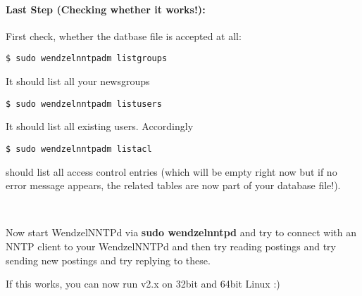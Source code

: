 \paragraph*{Last Step (Checking whether it works!):}

First check, whether the datbase file is accepted at all:

\begin{verbatim}
$ sudo wendzelnntpadm listgroups
\end{verbatim}

It should list all your newsgroups

\begin{verbatim}
$ sudo wendzelnntpadm listusers
\end{verbatim}

It should list all existing users. Accordingly

\begin{verbatim}
$ sudo wendzelnntpadm listacl
\end{verbatim}

should list all access control entries (which will be empty right now but if no error message appears, the related tables are now part of your database file!).

~

Now start WendzelNNTPd via {\bf sudo wendzelnntpd} and try to connect with an NNTP client to your WendzelNNTPd and then try reading postings and try sending new postings and try replying to these.

If this works, you can now run v2.x on 32bit and 64bit Linux :)

